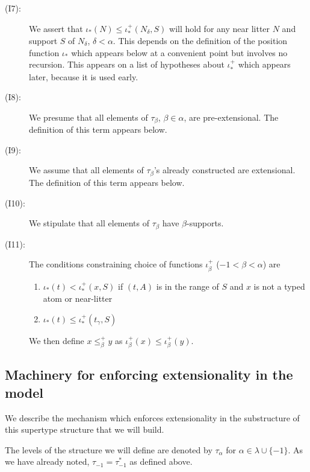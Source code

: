 \documentclass[112pt]{article}
\begin{document}
\begin{description}
\item[(I7):]  We assert that $\iota_*(N) \leq \iota_*^+(N_\delta,S)$ will hold for any near litter $N$ and support $S$ of $N_\delta$, $\delta<\alpha$.  This depends on the definition
of the position function $\iota_*$ which appears below at a convenient point but involves no recursion.  This appears on a list of hypotheses about $\iota_*^+$ which appears later, because it is used early.

\item[(I8):]  We presume that all elements of $\tau_\beta$, $\beta\in \alpha$, are pre-extensional.   The definition of this term appears below.

\item[(I9):]  We assume that all elements of $\tau_\beta$'s already constructed are extensional.  The definition of this term appears below.

\item[(I10):]  We stipulate that all elements of $\tau_\beta$ have $\beta$-supports.

\item[(I11):]  The conditions constraining choice of functions $\iota^+_\beta$ ($-1 < \beta < \alpha$) are

\begin{enumerate}

\item $\iota_*(t) < \iota^+_*(x,S)$ if $(t,A)$ is in the range of $S$ and $x$ is not a typed atom or near-litter

\item $\iota_*(t) \leq \iota^+_*(t_\gamma,S)$

\end{enumerate}

We then define $x \leq^+_\beta y$ as $\iota^+_\beta(x) \leq \iota^+_\beta(y)$.

\end{description}



\subsection{Machinery for enforcing extensionality in the model}
  We describe the mechanism which enforces extensionality in the substructure of this supertype structure that we will build.

The levels of the structure we will define are denoted by $\tau_\alpha$ for \newline $\alpha \in \lambda \cup \{-1\}$.  As we have already noted, $\tau_{-1}=\tau^*_{-1}$ as defined above.
\end{document}
